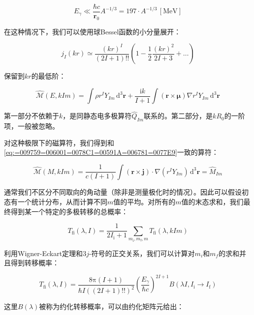 \begin{equation}
E_{\gamma}\ll\frac{\hbar c}{\boldsymbol{r}_{0}}A^{-1/3}=197\cdot A^{-1/3}\,[\text{MeV}]
\end{equation}

在这种情况下，我们可以使用球Bessel函数的小分量展开：

\begin{equation}
j_{I}(kr)\simeq\frac{(kr)^{I}}{(2I+1)!!}\left(1-\frac{1}{2}\frac{(kr)^{2}}{2I+3}+\dots\right)
\end{equation}

保留到$kr$的最低阶：

\begin{equation}
\hat{\mathcal{M}}(E,kIm)=\int\rho r^{I}Y_{Im}\,\mathrm{d}^{3}\boldsymbol{r}+\frac{\mathrm{i}k}{I+1}\int(\boldsymbol{r}\times\boldsymbol{\mu})\nabla r^{I}Y_{Im}\,\mathrm{d}^{3}\boldsymbol{r}
\end{equation}

第一部分不依赖于$k$，是同静态电多极算符$\hat{Q}_{Im}$联系的。第二部分，是$kR_{0}$的一阶项，一般被忽略。

对这种极限下的磁算符，我们得到和\ref{eq:=009759=006001=0078C1=00591A=006781=0077E9}一致的算符：

\begin{equation}
\hat{\mathcal{M}}(M,kIm)=\frac{1}{c(I+1)}\int(\boldsymbol{r}\times\boldsymbol{j})\cdot\nabla(r^{I}Y_{Im})\,\mathrm{d}^{3}\boldsymbol{r}=\hat{M}_{Im}
\end{equation}

通常我们不区分不同取向的角动量（除非是测量极化时的情况）。因此可以假设初态有一个统计分布，从而计算不同$m$值的平均。对所有的$m$值的末态求和，我们最终得到某一个特定的多极转移的总概率：

\begin{equation}
T_{\text{fi}}(\lambda,I)=\frac{1}{2I_{\text{i}}+1}\sum_{m_{\text{i}},m_{\text{f}},m}T_{\text{fi}}(\lambda,kIm)
\end{equation}

利用Wigner-Eckart定理和$3j$-符号的正交关系，我们可以计算对$m_{i}$和$m_{f}$的求和并且得到转移概率：

\begin{equation}
T_{\text{fi}}(\lambda,I)=\frac{8\mathrm{\pi}(I+1)}{\hbar I((2I+1)!!)^{2}}\left(\frac{E_{\gamma}}{\hbar c}\right)^{2I+1}B(\lambda I,I_{\text{i}}\rightarrow I_{\text{f}})\label{eq:=008F6C=0079FB=006982=007387}
\end{equation}
 

这里$B(\lambda)$被称为约化转移概率，可以由约化矩阵元给出：


